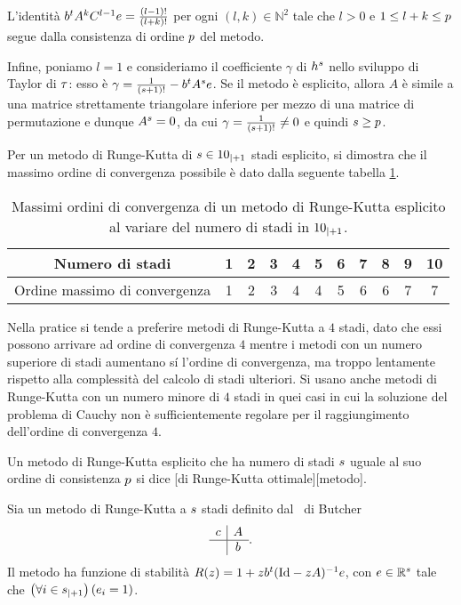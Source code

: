 \par L'identit\`a ${b}^tA^kC^{l - 1} e = \frac{(l - 1)!}{(l + k)!}$ per ogni $(l,k) \in \mathbb{N}^2$ tale che $l > 0$ e $1 \leq l + k \leq p$ segue dalla consistenza di ordine $p$ del metodo.
\par Infine, poniamo $l = 1$ e consideriamo il coefficiente $\gamma$ di $h^s$ nello sviluppo di Taylor di $\tau$: esso \`e $\gamma = \frac{1}{(s + 1)!} - {b}^tA^{s}e$. Se il metodo \`e esplicito, allora $A$ \`e simile a una matrice strettamente triangolare inferiore per mezzo di una matrice di permutazione e dunque $A^{s} = 0$, da cui $\gamma = \frac{1}{(s + 1)!} \neq 0$ e quindi $s \geq p$. \EndProof
\par Per un metodo di Runge-Kutta di $s \in {10}_{|+ 1}$ stadi esplicito, si dimostra che il massimo ordine di convergenza possibile \`e dato dalla seguente tabella \ref{RungeKutta_OrdiniDiConvergenza}.
\begin{table}[h]
	\centering
	\begin{tabular}{|c|cccccccccc|}
		\hline
		Numero di stadi&1&2&3&4&5&6&7&8&9&10\\
		\hline
		Ordine massimo di convergenza&1&2&3&4&4&5&6&6&7&7\\
		\hline
	\end{tabular}
	\caption{Massimi ordini di convergenza di un metodo di Runge-Kutta esplicito al variare del numero di stadi in ${10}_{|+ 1}$.}
	\label{RungeKutta_OrdiniDiConvergenza}
\end{table}
\par Nella pratice si tende a preferire metodi di Runge-Kutta a $4$ stadi, dato che essi possono arrivare ad ordine di convergenza $4$ mentre i metodi con un numero superiore di stadi aumentano s\'i l'ordine di convergenza, ma troppo lentamente rispetto alla complessit\`a del calcolo di stadi ulteriori. Si usano anche metodi di Runge-Kutta con un numero minore di $4$ stadi in quei casi in cui la soluzione del problema di Cauchy non \`e sufficientemente regolare per il raggiungimento dell'ordine di convergenza $4$.
\begin{Definition}
	Un metodo di Runge-Kutta esplicito che ha numero di stadi $s$ uguale al suo ordine di consistenza $p$ si dice [di Runge-Kutta ottimale][metodo].
\end{Definition}
\begin{Theorem}
	Sia un metodo di Runge-Kutta a $s$ stadi definito dal \tableau\ di Butcher
	\[
	\begin{array}{c|c}
		c	&	A\\
		\hline
			&	b
	\end{array}.
	\]
	Il metodo ha funzione di stabilit\`a $\StabilityFunction(z) = 1 + z \Transposed{b} (\Identity - z A)^{-1} e$, con $e \in \mathbb{R}^s$ tale che $\left ( \forall i \in {s}_{|+ 1} \right ) \left ( e_i = 1 \right )$.
\end{Theorem}
